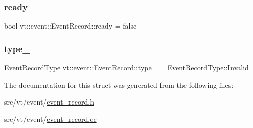 \subsubsection{\texorpdfstring{ready}{ready}}
{\footnotesize\ttfamily bool vt\+::event\+::\+Event\+Record\+::ready = false\hspace{0.3cm}{\ttfamily [private]}}

\mbox{\label{structvt_1_1event_1_1_event_record_a2b2684a996dd14b092ba3fef2fcce6b4}} 
\subsubsection{\texorpdfstring{type\+\_\+}{type\_}}
{\footnotesize\ttfamily \hyperlink{namespacevt_1_1event_a1ea9fec44d101bf40b8fd786d44ebed9}{Event\+Record\+Type} vt\+::event\+::\+Event\+Record\+::type\+\_\+ = \hyperlink{namespacevt_1_1event_a1ea9fec44d101bf40b8fd786d44ebed9a4bbb8f967da6d1a610596d7257179c2b}{Event\+Record\+Type\+::\+Invalid}\hspace{0.3cm}{\ttfamily [private]}}



The documentation for this struct was generated from the following files\+:\begin{DoxyCompactItemize}
\item 
src/vt/event/\hyperlink{event__record_8h}{event\+\_\+record.\+h}\item 
src/vt/event/\hyperlink{event__record_8cc}{event\+\_\+record.\+cc}\end{DoxyCompactItemize}
